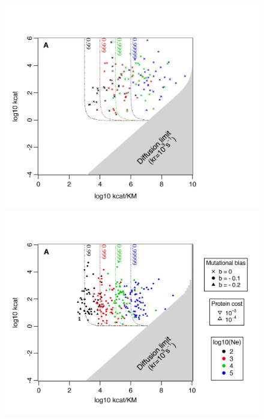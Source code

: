 \begin{figure}[h!]
\centering
\begin{minipage}[c]{0.48\linewidth}
\includegraphics[scale=0.56,trim=0cm 0cm 3cm 1.5cm,clip]{pics/SM-Enzymes/2DFitLandscape_Evo_Results_highF_nobias.jpeg}
\end{minipage} \hspace{-0.5cm}%
\begin{minipage}[c]{0.48\linewidth}
\includegraphics[scale=0.56,trim=1cm 0cm 0.5cm 1.5cm,clip]{pics/SM-Enzymes/2DFitLandscape_Evo_Results_highF_withbias.jpeg} 

\end{minipage}
\end{figure}
